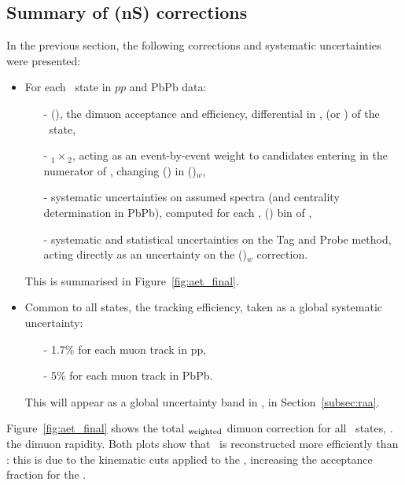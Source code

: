 \subsection{Summary of \texorpdfstring{\PgU(nS)}{Y(nS)} corrections}
\label{sec:aCorr_summary}
In the previous section, the following corrections and systematic
uncertainties were presented:
\begin{itemize}
\item For each \PgU\ state in $pp$ and PbPb data:
  \begin{itemize}
  \item[-] \acc\eff(\Pgm\Pgm), the dimuon acceptance and efficiency,
    differential in \pt, \y (or \Npart) of the \PgU\ state,
  \item[-] \Ctnp$_1\times$\Ctnp$_2$, acting as an event-by-event
    weight to candidates entering in the
    numerator of \acc\eff, changing \acc\eff(\Pgm\Pgm) in
    \acc\eff(\Pgm\Pgm)$_{w}$,
  \item[-] systematic uncertainties on assumed spectra (and centrality
    determination in PbPb), computed for each \pt, \y (\Npart) bin of
    \acc\eff,
  \item[-] systematic and statistical uncertainties on the
    Tag and Probe method, acting directly as an uncertainty on the
    \acc\eff(\Pgm\Pgm)$_{w}$ correction.
  \end{itemize}
This is summarised in Figure~\ref{fig:aet_final}.
\item Common to all states, the tracking efficiency, taken as a global
  systematic uncertainty:
  \begin{itemize}
  \item[-] 1.7\% for each muon track in pp,
  \item[-] 5\% for each muon track in PbPb.
  \end{itemize}
  This will appear as a global uncertainty band in \RAA, in Section~\ref{subsec:raa}.
\end{itemize}

\label{sec:aet_summary}
Figure~\ref{fig:aet_final} shows the total \acc\eff$_{\rm weighted}$
dimuon correction for all \PgU\ states, \vs. the dimuon rapidity. Both
 plots show that \PgUa\ is reconstructed more
efficiently than \PgUb: this is due to the kinematic cuts applied to
the \PgUa, increasing the acceptance fraction for the \PgUa.%

